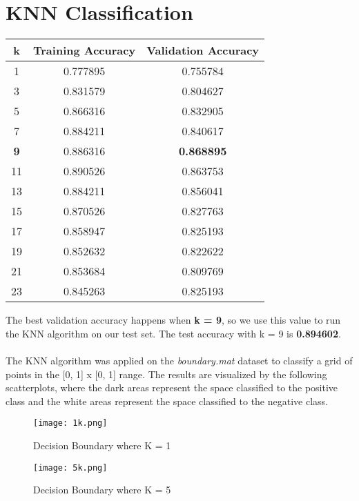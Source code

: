 \documentclass[12pt]{article}
\begin{document}
\section{KNN Classification}
\begin{center}
    \begin{tabular}{| c | c | c |} 
    \hline
    k & Training Accuracy & Validation Accuracy \\ 
         \hline
	1 & 0.777895 & 0.755784 \\
	\hline
	3 & 0.831579 & 0.804627 \\
	\hline
	5 & 0.866316 & 0.832905 \\
	\hline
	7 & 0.884211 & 0.840617 \\
	\hline
	\textbf{9} & 0.886316 & \textbf{0.868895} \\
	\hline
	11 & 0.890526 & 0.863753 \\
	\hline
	13 & 0.884211 & 0.856041 \\
	\hline
	15 & 0.870526 & 0.827763 \\
	\hline
	17 & 0.858947 & 0.825193 \\
	\hline
	19 & 0.852632 & 0.822622 \\
	\hline
	21 & 0.853684 & 0.809769 \\
	\hline
	23 & 0.845263 & 0.825193 \\
	\hline
    \end{tabular}
\end{center}

The best validation accuracy happens when \textbf{k = 9}, so we use this value to run the KNN algorithm on our test set. The test accuracy with k = 9 is \textbf{0.894602}. \\
\\ 
The KNN algorithm was applied on the \textit{boundary.mat} dataset to classify a grid of points in the [0, 1] x [0, 1] range. The results are visualized by the following scatterplots, where the dark areas represent the space classified to the positive class and the white areas represent the space classified to the negative class. \\

\begin{figure}[h!]
  \caption{Decision Boundary where K = 1}
  \centering
    \texttt{[image: 1k.png]}
\end{figure}

\begin{figure}[h!]
  \caption{Decision Boundary where K = 5}
  \centering
    \texttt{[image: 5k.png]}
\end{figure}
\end{document}
